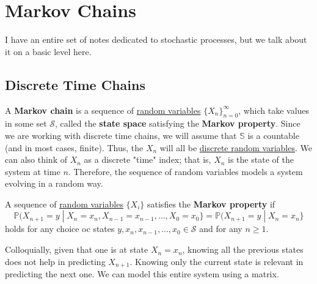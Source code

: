 \section{Markov Chains}

  I have an entire set of notes dedicated to stochastic processes, but we talk about it on a basic level here. 

\subsection{Discrete Time Chains}

  \begin{definition}
    \label{def:markov-chain}
    A \textbf{Markov chain} is a sequence of \hyperref[def:random-variable]{random variables} $\{X_n\}_{n=0}^\infty$, which take values in some set $\mathcal{S}$, called the \textbf{state space} satisfying the \textbf{Markov property}. Since we are working with discrete time chains, we will assume that $\mathbb{S}$ is a countable (and in most cases, finite). Thus, the $X_n$ will all be \hyperref[def:discrete-random-variable]{discrete random variables}. We can also think of $X_n$ as a discrete "time" index; that is, $X_n$ is the state of the system at time $n$. Therefore, the sequence of random variables models a system evolving in a random way. 
  \end{definition}

  \begin{definition}
    \label{def:markov-property}
    A sequence of \hyperref[def:random-variable]{random variables} $\{X_i\}$ satisfies the \textbf{Markov property} if 
    \begin{equation}
      \mathbb{P}(X_{n+1} = y \; | \; X_n = x_n, X_{n-1} = x_{n-1}, ..., X_0 = x_0\} = \mathbb{P}(X_{n+1} = y \; | \; X_n = x_n\}
    \end{equation}
    holds for any choice oc states $y, x_n, x_{n-1}, ..., x_0 \in \mathcal{S}$ and for any $n \geq 1$. 
  \end{definition}

  Colloquially, given that one is at state $X_n = x_n$, knowing all the previous states does not help in predicting $X_{n+1}$. Knowing only the current state is relevant in predicting the next one. We can model this entire system using a matrix. 

